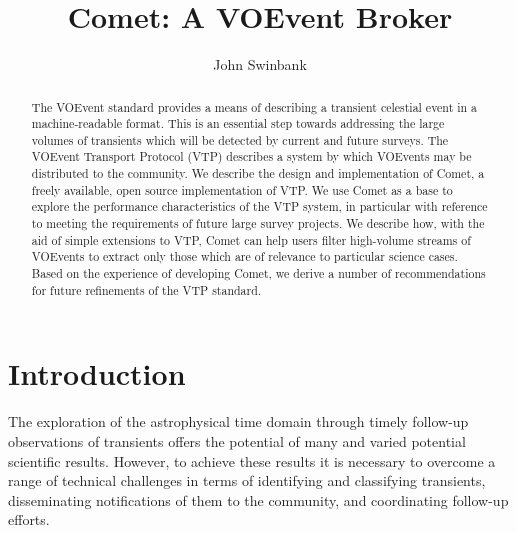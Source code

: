 \documentclass[5p,authoryear]{elsarticle}
\begin{document}
\begin{frontmatter}

\title{Comet: A VOEvent Broker}

\author{John Swinbank}

\address{Astronomical Institute ``Anton Pannekoek'', University of Amsterdam, Postbus 94249, 1090 GE Amsterdam, The Netherlands}

\begin{abstract}

The VOEvent standard provides a means of describing a transient celestial
event in a machine-readable format. This is an essential step towards
addressing the large volumes of transients which will be detected by current
and future surveys. The VOEvent Transport Protocol (VTP) describes a system by
which VOEvents may be distributed to the community. We describe the design and
implementation of Comet, a freely available, open source implementation of
VTP. We use Comet as a base to explore the performance characteristics of the
VTP system, in particular with reference to meeting the requirements of future
large survey projects. We describe how, with the aid of simple extensions to
VTP, Comet can help users filter high-volume streams of VOEvents to extract
only those which are of relevance to particular science cases.  Based on the
experience of developing Comet, we derive a number of recommendations for
future refinements of the VTP standard.

\end{abstract}

\begin{keyword}


\end{keyword}

\end{frontmatter}

\section{Introduction}
\label{sec:intro}

The exploration of the astrophysical time domain through timely follow-up
observations of transients offers the potential of many and varied potential
scientific results. However, to achieve these results it is necessary to
overcome a range of technical challenges in terms of identifying and
classifying transients, disseminating notifications of them to the community,
and coordinating follow-up efforts.
\end{document}
